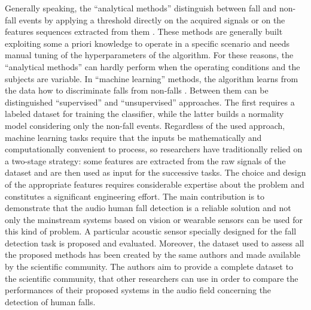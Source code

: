Generally speaking, the ``analytical methods'' distinguish between fall and non-fall events by applying a threshold directly on the acquired signals or on the features sequences extracted from them \cite{noury2007fall}.
These methods are generally built exploiting some a priori knowledge to operate in a specific scenario and needs manual tuning of the hyperparameters of the algorithm. For these reasons, the ``analytical methods'' can hardly perform when the operating conditions and the subjects are variable. In ``machine learning'' methods, the algorithm learns from the data how to discriminate falls from non-falls \cite{noury2007fall}. Between them can be distinguished ``supervised'' and  ``unsupervised'' approaches. The first requires a labeled dataset for training the classifier, while the latter builds a normality model considering only the non-fall events. Regardless of the used approach, machine learning tasks require that the inputs be mathematically and computationally convenient to process, so researchers have traditionally relied on a two-stage strategy: some features are extracted from the raw signals of the dataset and are then used as input for the successive tasks. The choice and design of the appropriate features requires considerable expertise about the problem and constitutes a significant engineering effort.
The main contribution is to demonstrate that the audio human fall detection is a reliable solution and not only the mainstream systems based on vision or wearable sensors can be used for this kind of problem. A particular acoustic sensor specially designed for the fall detection task is proposed and evaluated. Moreover, the dataset used to assess all the proposed methods has been created by the same authors and made available by the scientific community. The authors aim to provide a complete dataset to the scientific community, that other researchers can use in order to compare the performances of their proposed systems in the audio field concerning the detection of human falls. 
